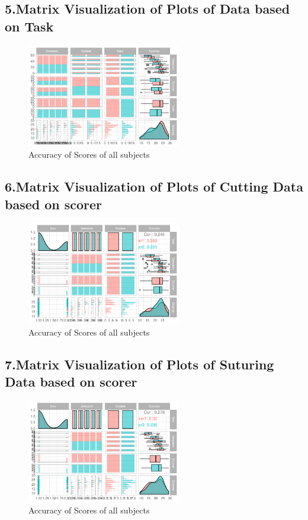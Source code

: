 \documentclass[12pt,epsf]{report}
\begin{document}
\subsection*{5.Matrix Visualization of Plots of Data based on Task}
\begin{figure}[!htb]
	\centering
	\includegraphics[width=0.6\textwidth]{Data_GGpairs.pdf}
	\caption{Accuracy of Scores of all subjects}
	\centering
\end{figure}
\FloatBarrier
\subsection*{6.Matrix Visualization of Plots of Cutting Data based on scorer}
\begin{figure}[!htb]
	\centering
	\includegraphics[width=0.6\textwidth]{Cutting_GGpairs.pdf}
	\caption{Accuracy of Scores of all subjects}
	\centering
\end{figure}
\FloatBarrier
\subsection*{7.Matrix Visualization of Plots of Suturing Data based on scorer}
\begin{figure}[!htb]
	\centering
	\includegraphics[width=0.6\textwidth]{Suturing_GGpairs.pdf}
	\caption{Accuracy of Scores of all subjects}
	\centering
\end{figure}
\end{document}
